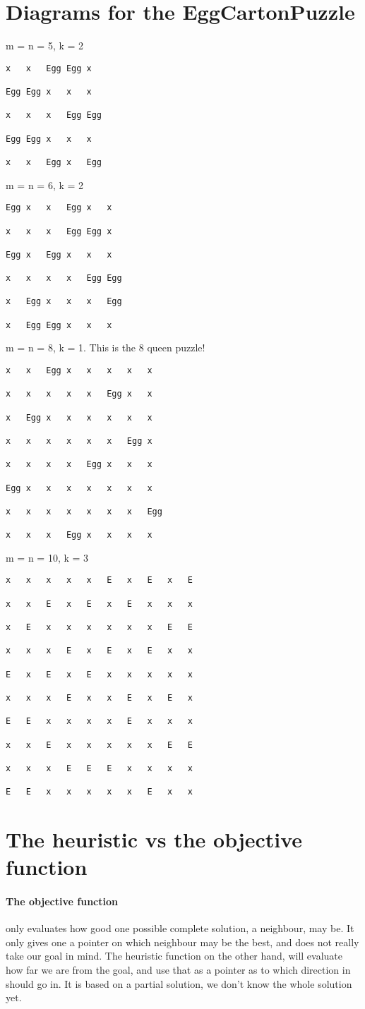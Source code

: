\documentclass[11pt,a4paper]{article}
\begin{document}
\section{Diagrams for the EggCartonPuzzle}
m = n = 5, k = 2
\begin{lstlisting}
x	x	Egg	Egg	x

Egg	Egg	x	x	x

x	x	x	Egg	Egg

Egg	Egg	x	x	x

x	x	Egg	x	Egg
\end{lstlisting}
m = n = 6, k = 2
\begin{lstlisting}
Egg	x	x	Egg	x	x

x	x	x	Egg	Egg	x

Egg	x	Egg	x	x	x

x	x	x	x	Egg	Egg

x	Egg	x	x	x	Egg

x	Egg	Egg	x	x	x
\end{lstlisting}
m = n = 8, k = 1.
This is the 8 queen puzzle!
\begin{lstlisting}
x	x	Egg	x	x	x	x	x

x	x	x	x	x	Egg	x	x

x	Egg	x	x	x	x	x	x

x	x	x	x	x	x	Egg	x

x	x	x	x	Egg	x	x	x

Egg	x	x	x	x	x	x	x

x	x	x	x	x	x	x	Egg

x	x	x	Egg	x	x	x	x
\end{lstlisting}
\clearpage
m = n = 10, k = 3

\begin{lstlisting}
x   x   x   x   x   E   x   E   x   E

x   x   E   x   E   x   E   x   x   x

x   E   x   x   x   x   x   x   E   E

x   x   x   E   x   E   x   E   x   x

E   x   E   x   E   x   x   x   x   x

x   x   x   E   x   x   E   x   E   x

E   E   x   x   x   x   E   x   x   x

x   x   E   x   x   x   x   x   E   E

x   x   x   E   E   E   x   x   x   x

E   E   x   x   x   x   x   E   x   x
\end{lstlisting}

\section{The heuristic vs the objective function}
\paragraph{The objective function} only evaluates how good one possible complete solution, a neighbour, may be. It only gives one a pointer on which neighbour may be the best, and does not really take our goal in mind. The heuristic function on the other hand, will evaluate how far we are from the goal, and use that as a pointer as to which direction in should go in. It is based on a partial solution, we don't know the whole solution yet.
\end{document}

